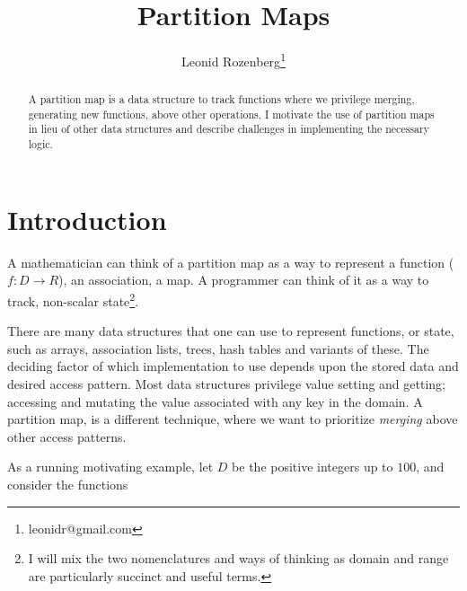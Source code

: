 \documentclass{article}
\begin{document}
\title{Partition Maps}
\author{Leonid Rozenberg\thanks{leonidr@gmail.com}}
\maketitle

\begin{abstract}
  A partition map is a data structure to track functions where we
  privilege merging,
  generating new functions,
  above other operations.
  I motivate the use of partition maps in lieu of other data structures
  and describe challenges in implementing the necessary logic.
\end{abstract}

\section{Introduction}

A mathematician can think of a partition map as a way to represent a function
($f : D \rightarrow R$), an association, a map.
A programmer can think of it as a way to track, non-scalar
state\footnote{I will mix the two nomenclatures and ways of thinking
as domain and range are particularly succinct and useful terms.}.

There are many data structures that one can use to represent functions,
or state,
such as arrays, association lists, trees, hash tables and variants of these.
The deciding factor of which implementation to use depends upon the stored
data and desired access pattern.
Most data structures privilege value setting and getting;
accessing and mutating the value associated with any key in the domain.
A partition map, is a different technique, where we want to prioritize
\emph{merging} above other access patterns.

As a running motivating example,
let $D$ be the positive integers up to $100$,
and consider the functions
\end{document}
